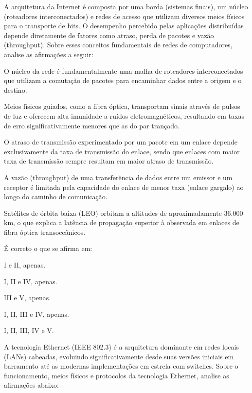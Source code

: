\documentclass[11pt, addpoints]{modelo/prova2}
\begin{document}
\maketitle 

\question[0.5] A arquitetura da Internet é composta por uma borda (sistemas finais), um núcleo (roteadores interconectados) e redes de acesso que utilizam diversos meios físicos para o transporte de bits. O desempenho percebido pelas aplicações distribuídas depende diretamente de fatores como atraso, perda de pacotes e vazão (throughput). Sobre esses conceitos fundamentais de redes de computadores, analise as afirmações a seguir:
    \begin{statements}
        \item O núcleo da rede é fundamentalmente uma malha de roteadores interconectados que utilizam a comutação de pacotes para encaminhar dados entre a origem e o destino.
        \item Meios físicos guiados, como a fibra óptica, transportam sinais através de pulsos de luz e oferecem alta imunidade a ruídos eletromagnéticos, resultando em taxas de erro significativamente menores que as do par trançado.
        \item O atraso de transmissão experimentado por um pacote em um enlace depende exclusivamente da taxa de transmissão do enlace, sendo que enlaces com maior taxa de transmissão sempre resultam em maior atraso de transmissão.
        \item A vazão (throughput) de uma transferência de dados entre um emissor e um receptor é limitada pela capacidade do enlace de menor taxa (enlace gargalo) ao longo do caminho de comunicação.
        \item Satélites de órbita baixa (LEO) orbitam a altitudes de aproximadamente 36.000 km, o que explica a latência de propagação superior à observada em enlaces de fibra óptica transoceânicos.
    \end{statements}
    É correto o que se afirma em:
    \begin{choices}
        \item I e II, apenas.
        \item I, II e IV, apenas. 
        \item III e V, apenas.
        \item I, II, III e IV, apenas.
        \item I, II, III, IV e V.
    \end{choices} 
\question[0.5] A tecnologia Ethernet (IEEE 802.3) é a arquitetura dominante em redes locais (LANs) cabeadas, evoluindo significativamente desde suas versões iniciais em barramento até as modernas implementações em estrela com switches. Sobre o funcionamento, meios físicos e protocolos da tecnologia Ethernet, analise as afirmações abaixo:
\end{document}
